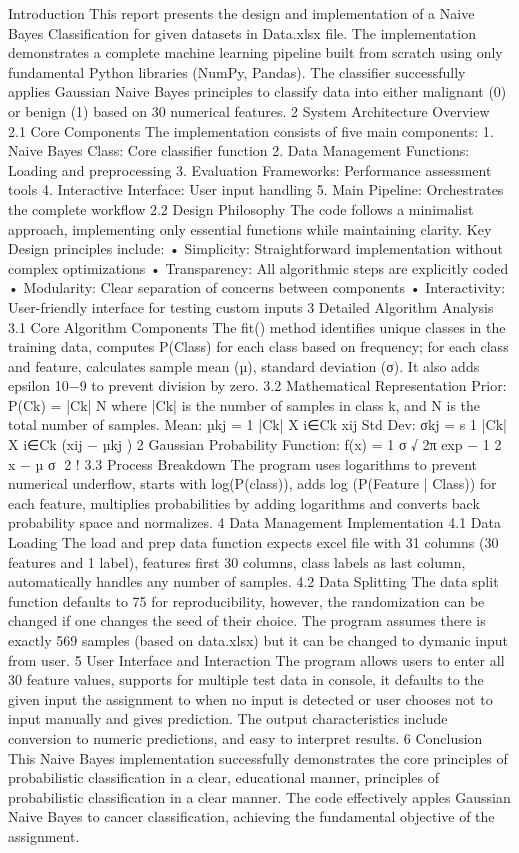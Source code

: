 Introduction
This report presents the design and implementation of a Naive Bayes Classification for given datasets
in Data.xlsx file. The implementation demonstrates a complete machine learning pipeline built from
scratch using only fundamental Python libraries (NumPy, Pandas). The classifier successfully applies
Gaussian Naive Bayes principles to classify data into either malignant (0) or benign (1) based on 30
numerical features.
2 System Architecture Overview
2.1 Core Components
The implementation consists of five main components:
1. Naive Bayes Class: Core classifier function
2. Data Management Functions: Loading and preprocessing
3. Evaluation Frameworks: Performance assessment tools
4. Interactive Interface: User input handling
5. Main Pipeline: Orchestrates the complete workflow
2.2 Design Philosophy
The code follows a minimalist approach, implementing only essential functions while maintaining clarity.
Key Design principles include:
• Simplicity: Straightforward implementation without complex optimizations
• Transparency: All algorithmic steps are explicitly coded
• Modularity: Clear separation of concerns between components
• Interactivity: User-friendly interface for testing custom inputs
3 Detailed Algorithm Analysis
3.1 Core Algorithm Components
The fit() method identifies unique classes in the training data, computes P(Class) for each class based
on frequency; for each class and feature, calculates sample mean (µ), standard deviation (σ). It also
adds epsilon 10−9
to prevent division by zero.
3.2 Mathematical Representation
Prior:
P(Ck) = |Ck|
N
where |Ck| is the number of samples in class k, and N is the total number of samples.
Mean:
µkj =
1
|Ck|
X
i∈Ck
xij
Std Dev:
σkj =
s
1
|Ck|
X
i∈Ck
(xij − µkj )
2
Gaussian Probability Function:
f(x) = 1
σ
√
2π
exp
−
1
2

x − µ
σ
2
!
3.3 Process Breakdown
The program uses logarithms to prevent numerical underflow, starts with log(P(class)), adds
log (P(Feature | Class))
for each feature, multiplies probabilities by adding logarithms and converts back probability space and
normalizes.
4 Data Management Implementation
4.1 Data Loading
The load and prep data function expects excel file with 31 columns (30 features and 1 label), features
first 30 columns, class labels as last column, automatically handles any number of samples.
4.2 Data Splitting
The data split function defaults to 75%
for reproducibility, however, the randomization can be changed if one changes the seed of their choice.
The program assumes there is exactly 569 samples (based on data.xlsx) but it can be changed to dymanic
input from user.
5 User Interface and Interaction
The program allows users to enter all 30 feature values, supports for multiple test data in console, it
defaults to the given input the assignment to when no input is detected or user chooses not to input
manually and gives prediction. The output characteristics include conversion to numeric predictions,
and easy to interpret results.
6 Conclusion
This Naive Bayes implementation successfully demonstrates the core principles of probabilistic classification in a clear, educational manner, principles of probabilistic classification in a clear manner. The code
effectively apples Gaussian Naive Bayes to cancer classification, achieving the fundamental objective of
the assignment.
